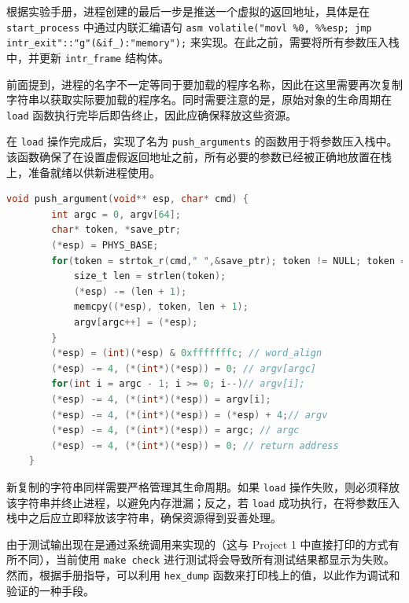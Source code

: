 \documentclass{article}
\begin{document}
根据实验手册，进程创建的最后一步是推送一个虚拟的返回地址，具体是在 \texttt{start\_process} 中通过内联汇编语句 \texttt{asm volatile("movl \%0, \%\%esp; jmp intr\_exit"::"g"(\&if\_):"memory");} 来实现。在此之前，需要将所有参数压入栈中，并更新 \texttt{intr\_frame} 结构体。

前面提到，进程的名字不一定等同于要加载的程序名称，因此在这里需要再次复制字符串以获取实际要加载的程序名。同时需要注意的是，原始对象的生命周期在 \texttt{load} 函数执行完毕后即告终止，因此应确保释放这些资源。

在 \texttt{load} 操作完成后，实现了名为 \texttt{push\_arguments} 的函数用于将参数压入栈中。该函数确保了在设置虚假返回地址之前，所有必要的参数已经被正确地放置在栈上，准备就绪以供新进程使用。

\begin{lstlisting}[language=C]
	void push_argument(void** esp, char* cmd) { 
		int argc = 0, argv[64]; 
		char* token, *save_ptr;
		(*esp) = PHYS_BASE;
		for(token = strtok_r(cmd," ",&save_ptr); token != NULL; token = strtok_r(NULL," ",&save_ptr)) { 
			size_t len = strlen(token); 
			(*esp) -= (len + 1); 
			memcpy((*esp), token, len + 1); 
			argv[argc++] = (*esp); 
		}
		(*esp) = (int)(*esp) & 0xfffffffc; // word_align 
		(*esp) -= 4, (*(int*)(*esp)) = 0; // argv[argc]
		for(int i = argc - 1; i >= 0; i--)// argv[i]; 
		(*esp) -= 4, (*(int*)(*esp)) = argv[i];
		(*esp) -= 4, (*(int*)(*esp)) = (*esp) + 4;// argv 
		(*esp) -= 4, (*(int*)(*esp)) = argc; // argc
		(*esp) -= 4, (*(int*)(*esp)) = 0; // return address 
	}
\end{lstlisting}

新复制的字符串同样需要严格管理其生命周期。如果 \texttt{load} 操作失败，则必须释放该字符串并终止进程，以避免内存泄漏；反之，若 \texttt{load} 成功执行，在将参数压入栈中之后应立即释放该字符串，确保资源得到妥善处理。

由于测试输出现在是通过系统调用来实现的（这与 Project 1 中直接打印的方式有所不同），当前使用 \texttt{make check} 进行测试将会导致所有测试结果都显示为失败。然而，根据手册指导，可以利用 \texttt{hex\_dump} 函数来打印栈上的值，以此作为调试和验证的一种手段。
\end{document}
